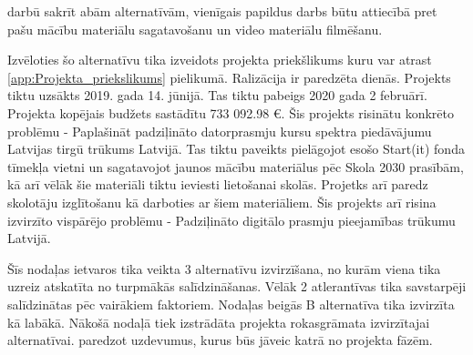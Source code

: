 darbū sakrīt abām alternatīvām, vienīgais papildus darbs būtu attiecībā pret pašu mācību materiālu
sagatavošanu un video materiālu filmēšanu.
\par
Izvēloties šo alternatīvu tika izveidots projekta priekšlikums kuru var atrast \ref{app:Projekta_priekslikums}
pielikumā. Ralizācija ir paredzēta %
dienās. Projekts tiktu uzsākts 2019. gada 14. jūnijā. Tas tiktu pabeigs 2020 gada 2 februārī. Projekta kopējais
budžets sastādītu 733 092.98 €. Šis projekts risinātu konkrēto problēmu - Paplašināt padziļināto datorprasmju 
kursu spektra piedāvājumu Latvijas tirgū
trūkums Latvijā. Tas tiktu paveikts pielāgojot esošo Start(it) fonda tīmekļa vietni un sagatavojot jaunos 
mācību materiālus pēc Skola 2030 prasībām, kā arī vēlāk šie materiāli tiktu ieviesti lietošanai skolās.
Projetks arī paredz skolotāju izglītošanu kā darboties ar šiem materiāliem. Šis projekts arī risina 
izvirzīto vispārējo problēmu - Padziļināto digitālo prasmju pieejamības trūkumu Latvijā.
\par
Šīs nodaļas ietvaros tika veikta 3 alternatīvu izvirzīšana, no kurām viena tika uzreiz atskatīta no 
turpmākās salīdzināšanas. Vēlāk 2 atlerantīvas tika savstarpēji salīdzinātas pēc vairākiem faktoriem.
Nodaļas beigās B alternatīva tika izvirzīta kā labākā. Nākošā nodaļā tiek izstrādāta projekta rokasgrāmata
izvirzītajai alternatīvai. paredzot uzdevumus, kurus būs jāveic katrā no projekta fāzēm.